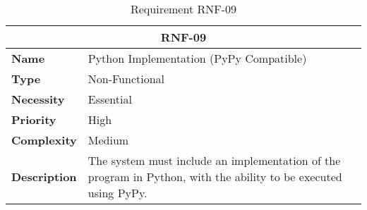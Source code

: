 \begin{table}[H]
    \centering
    \begin{tabular}{l p{10cm}}
        \toprule
        \multicolumn{2}{c}{\textbf{RNF-09}} \\
        \toprule
        \textbf{Name}         & Python Implementation (PyPy Compatible) \\
        \textbf{Type}         & Non-Functional \\
        \textbf{Necessity}    & Essential \\
        \textbf{Priority}     & High \\
        \textbf{Complexity}   & Medium \\
        \textbf{Description}  & The system must include an implementation of the program in Python, with the ability to be executed using PyPy. \\
        \bottomrule
    \end{tabular}
\caption{Requirement RNF-09}\label{tab:rnf-09}
\end{table}

